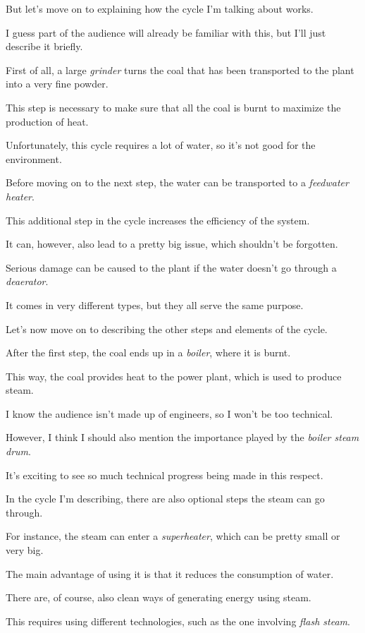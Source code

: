 But let's move on to explaining how the cycle I'm talking about works.

\ex I guess part of the audience will already be familiar with this, but I'll just describe it briefly.

First of all, a large \textit{grinder} turns the coal that has been transported to the plant into a very fine powder.

This step is necessary to make sure that all the coal is burnt to maximize the production of heat.

\ex Unfortunately, this cycle requires a lot of water, so it's not good for the environment.

Before moving on to the next step, the water can be transported to a \textit{feedwater heater}.

This additional step in the cycle increases the efficiency of the system.

\ex It can, however, also lead to a pretty big issue, which shouldn't be forgotten.

Serious damage can be caused to the plant if the water doesn't go through a \textit{deaerator}.

It comes in very different types, but they all serve the same purpose.

\ex Let's now move on to describing the other steps and elements of the cycle.

After the first step, the coal ends up in a \textit{boiler}, where it is burnt.

This way, the coal provides heat to the power plant, which is used to produce steam.

\ex I know the audience isn't made up of engineers, so I won't be too technical.

However, I think I should also mention the importance played by the \textit{boiler steam drum}.

It's exciting to see so much technical progress being made in this respect.

\ex In the cycle I'm describing, there are also optional steps the steam can go through.

For instance, the steam can enter a \textit{superheater}, which can be pretty small or very big.

The main advantage of using it is that it reduces the consumption of water.

\ex There are, of course, also clean ways of generating energy using steam.

This requires using different technologies, such as the one involving \textit{flash steam}.

